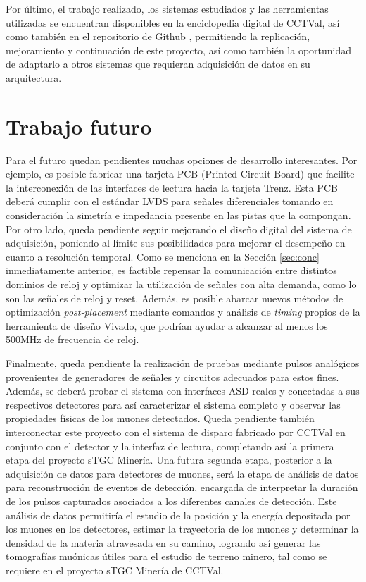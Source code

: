 Por último, el trabajo realizado, los sistemas estudiados y las herramientas utilizadas se encuentran disponibles en la enciclopedia digital de CCTVal, así como también en el repositorio de Github \cite{GonzalezMuonRepository}, permitiendo la replicación, mejoramiento y continuación de este proyecto, así como también la oportunidad de adaptarlo a otros sistemas que requieran adquisición de datos en su arquitectura.


\section{Trabajo futuro}

Para el futuro quedan pendientes muchas opciones de desarrollo interesantes. Por ejemplo, es posible fabricar una tarjeta PCB (Printed Circuit Board) que facilite la interconexión de las interfaces de lectura hacia la tarjeta Trenz. Esta PCB deberá cumplir con el estándar LVDS para señales diferenciales tomando en consideración la simetría e impedancia presente en las pistas que la compongan. Por otro lado, queda pendiente seguir mejorando el diseño digital del sistema de adquisición, poniendo al límite sus posibilidades para mejorar el desempeño en cuanto a resolución temporal. Como se menciona en la Sección \ref{sec:conc} inmediatamente anterior, es factible repensar la comunicación entre distintos dominios de reloj y optimizar la utilización de señales con alta demanda, como lo son las señales de reloj y reset. Además, es posible abarcar nuevos métodos de optimización \textit{post-placement} mediante comandos y análisis de \textit{timing}\cite{XilinxUltraFastGuide} propios de la herramienta de diseño Vivado, que podrían ayudar a alcanzar al menos los 500MHz de frecuencia de reloj.

Finalmente, queda pendiente la realización de pruebas mediante pulsos analógicos provenientes de generadores de señales y circuitos adecuados para estos fines. Además, se deberá probar el sistema con interfaces ASD reales y conectadas a sus respectivos detectores para así caracterizar el sistema completo y observar las propiedades físicas de los muones detectados. Queda pendiente también interconectar este proyecto con el sistema de disparo\cite{Oyanadel2020SistemaSTGC} fabricado por CCTVal en conjunto con el detector y la interfaz de lectura, completando así la primera etapa del proyecto sTGC Minería. Una futura segunda etapa, posterior a la adquisición de datos para detectores de muones, será la etapa de análisis de datos para reconstrucción de eventos de detección, encargada de interpretar la duración de los pulsos capturados asociados a los diferentes canales de detección. Este análisis de datos permitiría el estudio de la posición y la energía depositada por los muones en los detectores, estimar la trayectoria de los muones y determinar la densidad de la materia atravesada en su camino, logrando así generar las tomografías muónicas útiles para el estudio de terreno minero, tal como se requiere en el proyecto sTGC Minería de CCTVal.
